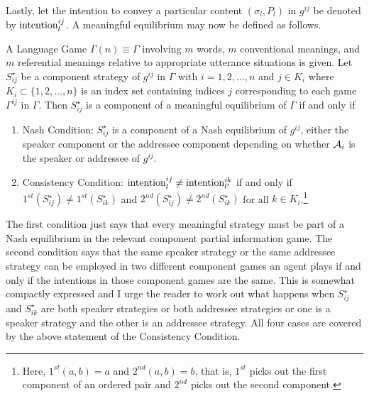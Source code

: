 Lastly, let the intention to convey a particular content $(\sigma_l,P_l)$ in $g^{ij}$ be denoted by $\hbox{intention}^{ij}_l$. A meaningful equilibrium may now be defined as follows.

\begin{definition}

A Language Game $\Gamma(n) \equiv \Gamma$ involving $m$ words, $m$ conventional meanings, and $m$ referential meanings relative to appropriate utterance situations is given. Let $S^\star_{ij}$ be a component strategy of $g^{ij}$ in $\Gamma$ with $i = 1, 2, \ldots, n$ and $j \in K_i$ where $K_i\subset \{1, 2, \ldots, n\}$ is an index set containing indices $j$ corresponding to each game $\Gamma^{ij}$ in $\Gamma$. Then $S^\star_{ij}$ is a component of a meaningful equilibrium of $\Gamma$ if and only if

\begin{enumerate}

\item Nash Condition: $S^\star_{ij}$ is a component of a Nash equilibrium of $g^{ij}$, either the speaker component or the addressee component depending on whether ${\cal A}_i$ is the speaker or addressee of $g^{ij}$.

\item Consistency Condition: $\hbox{intention}^{ij}_l \neq \hbox{intention}^{ik}_{l'}$ if and only if $1^{st}(S^\star_{ij}) \neq 1^{st}(S^\star_{ik})$ and $2^{nd}(S^\star_{ij}) \neq 2^{nd}(S^\star_{ik})$ for all $k \in K_i$.\footnote{Here, $1^{st}(a,b) = a$ and $2^{nd}(a,b) = b$, that is, $1^{st}$ picks out the first component of an ordered pair and $2^{nd}$ picks out the second component.}

\end{enumerate}

\label{def:me}
\end{definition}

The first condition just says that every meaningful strategy must be part of a Nash equilibrium in the relevant component partial information game. The second condition says that the same speaker strategy or the same addressee strategy can be employed in two different component games an agent plays if and only if the intentions in those component games are the same. This is somewhat compactly expressed and I urge the reader to work out what happens when $S^\star_{ij}$ and $S^\star_{ik}$ are both speaker strategies or both addressee strategies or one is a speaker strategy and the other is an addressee strategy. All four cases are covered by the above statement of the Consistency Condition.

